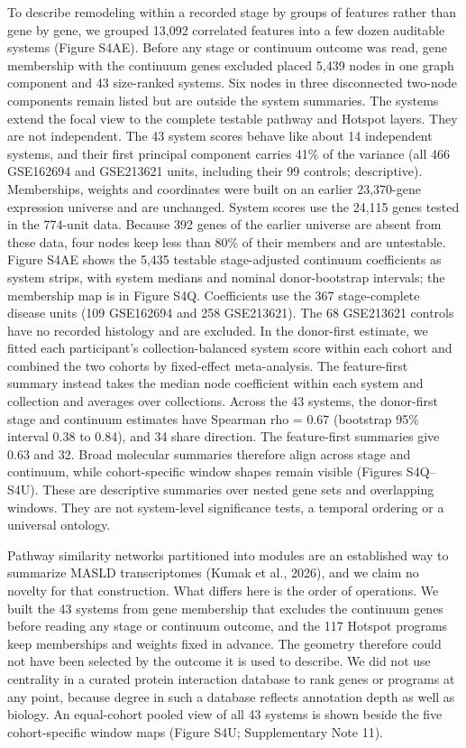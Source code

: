 To describe remodeling within a recorded stage by groups of features rather than gene by gene, we grouped 13,092 correlated features into a few dozen auditable systems (Figure S4AE). Before any stage or continuum outcome was read, gene membership with the continuum genes excluded placed 5,439 nodes in one graph component and 43 size-ranked systems. Six nodes in three disconnected two-node components remain listed but are outside the system summaries. The systems extend the focal view to the complete testable pathway and Hotspot layers. They are not independent. The 43 system scores behave like about 14 independent systems, and their first principal component carries 41\% of the variance (all 466 GSE162694 and GSE213621 units, including their 99 controls; descriptive). Memberships, weights and coordinates were built on an earlier 23,370-gene expression universe and are unchanged. System scores use the 24,115 genes tested in the 774-unit data. Because 392 genes of the earlier universe are absent from these data, four nodes keep less than 80\% of their members and are untestable. Figure S4AE shows the 5,435 testable stage-adjusted continuum coefficients as system strips, with system medians and nominal donor-bootstrap intervals; the membership map is in Figure S4Q. Coefficients use the 367 stage-complete disease units (109 GSE162694 and 258 GSE213621). The 68 GSE213621 controls have no recorded histology and are excluded. In the donor-first estimate, we fitted each participant's collection-balanced system score within each cohort and combined the two cohorts by fixed-effect meta-analysis. The feature-first summary instead takes the median node coefficient within each system and collection and averages over collections. Across the 43 systems, the donor-first stage and continuum estimates have Spearman rho = 0.67 (bootstrap 95\% interval 0.38 to 0.84), and 34 share direction. The feature-first summaries give 0.63 and 32. Broad molecular summaries therefore align across stage and continuum, while cohort-specific window shapes remain visible (Figures S4Q--S4U). These are descriptive summaries over nested gene sets and overlapping windows. They are not system-level significance tests, a temporal ordering or a universal ontology.

Pathway similarity networks partitioned into modules are an established way to summarize MASLD transcriptomes (Kumak et al., 2026), and we claim no novelty for that construction. What differs here is the order of operations. We built the 43 systems from gene membership that excludes the continuum genes before reading any stage or continuum outcome, and the 117 Hotspot programs keep memberships and weights fixed in advance. The geometry therefore could not have been selected by the outcome it is used to describe. We did not use centrality in a curated protein interaction database to rank genes or programs at any point, because degree in such a database reflects annotation depth as well as biology. An equal-cohort pooled view of all 43 systems is shown beside the five cohort-specific window maps (Figure S4U; Supplementary Note 11).

